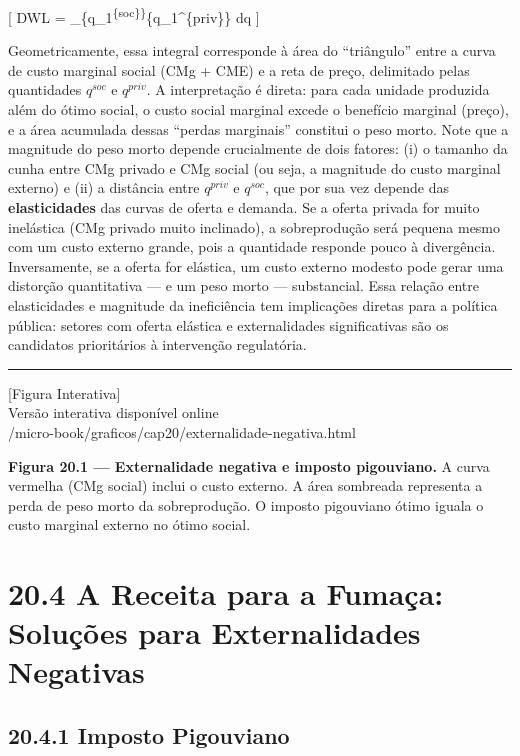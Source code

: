 \documentclass[11pt,twoside,openright]{book}
\newcommand{\figurePlaceholder}[1]{%
  \begin{center}
    \begin{tcolorbox}[
      width=0.85\textwidth,
      colback=graybg,
      colframe=gray,
      boxrule=0.5pt,
      arc=2pt,
      halign=center,
      valign=center,
      height=5cm
    ]
      \centering
      \vfill
      {\sffamily\color{gray}\large [Figura Interativa]}\\[6pt]
      {\sffamily\small\color{gray} Versão interativa disponível online}\\[4pt]
      {\ttfamily\tiny\color{gray} #1}
      \vfill
    \end{tcolorbox}
  \end{center}
}
\begin{document}
{[} DWL = \int\_\{q\_1\textsuperscript{\{soc\}\}}\{q\_1\^{}\{priv\}\}
\left[ C_1'(q) + E'(q) - P \right] dq {]}

Geometricamente, essa integral corresponde à área do ``triângulo'' entre
a curva de custo marginal social (CMg + CME) e a reta de preço,
delimitado pelas quantidades \(q^{soc}\) e \(q^{priv}\). A interpretação
é direta: para cada unidade produzida além do ótimo social, o custo
social marginal excede o benefício marginal (preço), e a área acumulada
dessas ``perdas marginais'' constitui o peso morto. Note que a magnitude
do peso morto depende crucialmente de dois fatores: (i) o tamanho da
cunha entre CMg privado e CMg social (ou seja, a magnitude do custo
marginal externo) e (ii) a distância entre \(q^{priv}\) e \(q^{soc}\),
que por sua vez depende das \textbf{elasticidades} das curvas de oferta
e demanda. Se a oferta privada for muito inelástica (CMg privado muito
inclinado), a sobreprodução será pequena mesmo com um custo externo
grande, pois a quantidade responde pouco à divergência. Inversamente, se
a oferta for elástica, um custo externo modesto pode gerar uma distorção
quantitativa --- e um peso morto --- substancial. Essa relação entre
elasticidades e magnitude da ineficiência tem implicações diretas para a
política pública: setores com oferta elástica e externalidades
significativas são os candidatos prioritários à intervenção regulatória.

\begin{center}\rule{0.5\linewidth}{0.5pt}\end{center}

\figurePlaceholder{/micro-book/graficos/cap20/externalidade-negativa.html}

\textbf{Figura 20.1 --- Externalidade negativa e imposto pigouviano.} A
curva vermelha (CMg social) inclui o custo externo. A área sombreada
representa a perda de peso morto da sobreprodução. O imposto pigouviano
ótimo iguala o custo marginal externo no ótimo social.

\section{20.4 A Receita para a Fumaça: Soluções para Externalidades
Negativas}\label{204}

\subsection{20.4.1 Imposto Pigouviano}\label{imposto-pigouviano}
\end{document}
